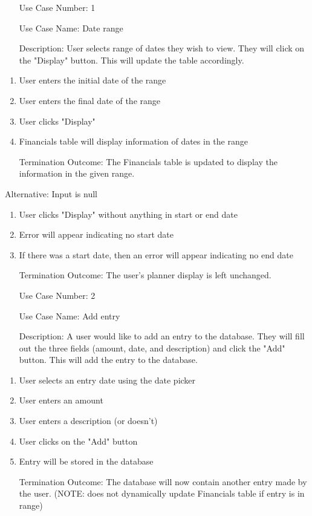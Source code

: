 \documentclass[10pt,conference,onecolumn,compsoc]{IEEEtran}
\begin{document}
\begin{itemize}
\item[Use Case Number:] 1
\item[Use Case Name:] Date range
\item[Description:] User selects range of dates they wish to view. They will click on the "Display" button. This will update the table accordingly.
\end{itemize}

\begin{enumerate}
\item User enters the initial date of the range
\item User enters the final date of the range
\item User clicks "Display"
\item Financials table will display information of dates in the range
\item[Termination Outcome:] The Financials table is updated to display the information in the given range.
\end{enumerate}

Alternative: Input is null
\begin{enumerate}
\item User clicks "Display" without anything in start or end date
\item Error will appear indicating no start date
\item If there was a start date, then an error will appear indicating no end date
\item[Termination Outcome:] The user's planner display is left unchanged.
\end{enumerate}

\begin{itemize}
\item[Use Case Number:] 2
\item[Use Case Name:] Add entry
\item[Description:] A user would like to add an entry to the database. They will fill out the three fields (amount, date, and description) and click the "Add" button. This will add the entry to the database.
\end{itemize}

\begin{enumerate}
\item User selects an entry date using the date picker
\item User enters an amount
\item User enters a description (or doesn't)
\item User clicks on the "Add" button
\item Entry will be stored in the database
\item[Termination Outcome:] The database will now contain another entry made by the user. (NOTE: does not dynamically update Financials table if entry is in range)
\end{enumerate}
\end{document}
